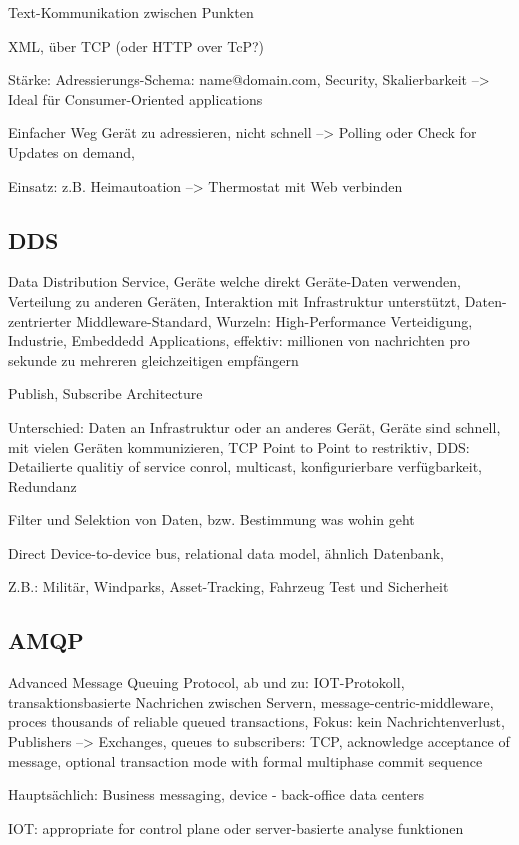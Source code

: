 Text-Kommunikation zwischen Punkten

XML, über TCP (oder HTTP over TcP?)

Stärke: Adressierungs-Schema: name@domain.com, Security, Skalierbarkeit 
--> Ideal für Consumer-Oriented applications

Einfacher Weg Gerät zu adressieren, nicht schnell --> Polling oder Check for Updates on demand, 

Einsatz: z.B. Heimautoation --> Thermostat mit Web verbinden


\subsection{DDS}
Data Distribution Service, Geräte welche direkt Geräte-Daten verwenden, Verteilung zu anderen Geräten, Interaktion mit Infrastruktur unterstützt, Daten-zentrierter Middleware-Standard, Wurzeln: High-Performance Verteidigung, Industrie, Embeddedd Applications, effektiv: millionen von nachrichten pro sekunde zu mehreren gleichzeitigen empfängern


Publish, Subscribe Architecture

Unterschied: Daten an Infrastruktur oder an anderes Gerät, Geräte sind schnell, mit vielen Geräten kommunizieren, TCP Point to Point to restriktiv, DDS: Detailierte qualitiy of service conrol, multicast, konfigurierbare verfügbarkeit, Redundanz

Filter und Selektion von Daten, bzw. Bestimmung was wohin geht

Direct Device-to-device bus, relational data model, ähnlich Datenbank, 

Z.B.: Militär, Windparks, Asset-Tracking, Fahrzeug Test und Sicherheit


\subsection{AMQP}
Advanced Message Queuing Protocol, ab und zu: IOT-Protokoll, transaktionsbasierte Nachrichen zwischen Servern, message-centric-middleware, proces thousands of reliable queued transactions, Fokus: kein Nachrichtenverlust, Publishers --> Exchanges, queues to subscribers: TCP, acknowledge acceptance of message, optional transaction mode with formal multiphase commit sequence

Hauptsächlich: Business messaging, device - back-office data centers

IOT: appropriate for control plane oder server-basierte analyse funktionen




